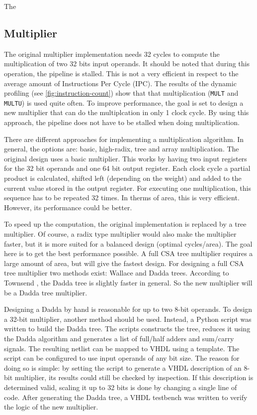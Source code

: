 \documentclass[final]{article}
\begin{document}
The 

\subsection{Multiplier}
The original multiplier implementation needs 32 cycles to compute the multiplication of two 32 bits input operands. It should be noted that during this operation, the pipeline is stalled. This is not a very efficient in respect to the average amount of Instructions Per Cycle (IPC). The results of the dynamic profiling (see \cref{fig:instruction-count}) show that that multiplication (\texttt{MULT} and \texttt{MULTU}) is used quite often. To improve performance, the goal is set to design a new multiplier that can do the multiplcation in only 1 clock cycle. By using this approach, the pipeline does not have to be stalled when doing multiplication.

There are different approaches for implementing a multiplication algorithm. In general, the options are: basic, high-radix, tree and array multiplication. The original design uses a basic multiplier. This works by having two input registers for the 32 bit operands and one 64 bit output register. Each clock cycle a partial product is calculated, shifted left (depending on the weight) and added to the current value stored in the output register. For executing one multiplication, this sequence has to be repeated 32 times. In therms of area, this is very efficient. However, its performance could be better.

To speed up the computation, the original implementation is replaced by a tree multiplier. Of course, a radix type multiplier would also make the multiplier faster, but it is more suited for a balanced design (optimal cycles/area). The goal here is to get the best performance possible. A full CSA tree multiplier requires a large amount of area, but will give the fastest design. For designing a full CSA tree multiplier two methods exist: Wallace and Dadda trees. According to Townsend \cite{townsend}, the Dadda tree is slightly faster in general. So the new multiplier will be a Dadda tree multiplier.

Designing a Dadda by hand is reasonable for up to two 8-bit operands. To design a 32-bit multiplier, another method should be used. Instead, a Python script was written to build the Dadda tree. The scripts constructs the tree, reduces it using the Dadda algorithm and generates a list of full/half adders and sum/carry signals. The resulting netlist can be mapped to VHDL using a template. The script can be configured to use input operands of any bit size. The reason for doing so is simple: by setting the script to generate a VHDL description of an 8-bit multiplier, its results could still be checked by inspection. If this description is determined valid, scaling it up to 32 bits is done by changing a single line of code. After generating the Dadda tree, a VHDL testbench was written to verify the logic of the new multiplier.
\end{document}
